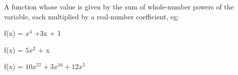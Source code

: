 A function whose value is given by the sum of whole-number powers of the variable,
each multiplied by a real-number coefficient, eg:
\par
f(x) = $x^{4}$  +3x + 1
\par
f(x) = $5x^{2}$  + x
\par
f(x) = $10x^{57} + 3x^{16} + 12x^{5}$ 